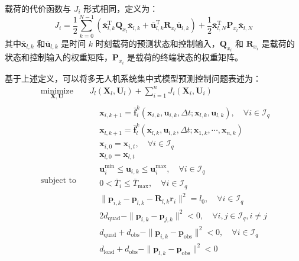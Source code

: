 \documentclass[lang=chs, degree=master, blindreview=false, winfonts=true]{yanputhesis}
\begin{document}
载荷的代价函数与 \( J_i \) 形式相同，定义为：
\begin{equation}
    J_i = \frac{1}{2}\sum_{k=0}^{N-1}\left(\bar{\boldsymbol{x}}_{l,k}^\mathrm{T}\boldsymbol{Q}_{x_l}\bar{\boldsymbol{x}}_{l,k}+\bar{\boldsymbol{u}}_{l,k}^\mathrm{T}\boldsymbol{R}_{x_l}\bar{\boldsymbol{u}}_{l,k}\right)+\frac{1}{2}\bar{\boldsymbol{x}}_{l,N}^\mathrm{T}\boldsymbol{P}_{x_l}\bar{\boldsymbol{x}}_{l,N}
	\label{jpayload}
\end{equation}
其中$\bar{\boldsymbol{x}}_{l,k}$ 和$\bar{\boldsymbol{u}}_{l,k}$ 是时间 $k$ 时刻载荷的预测状态和控制输入，$\boldsymbol{Q}_{x_i}$ 和 $\boldsymbol{R}_{x_i}$ 是载荷的状态和控制输入的权重矩阵，$\boldsymbol{P}_{x_i}$ 是载荷的终端状态的权重矩阵。


基于上述定义，可以将多无人机系统集中式模型预测控制问题表述为：
\begin{equation}
	\begin{aligned} 
	&\operatorname*{minimize}_{\bm{X}, \bm{U}}& & J_l(\bm{X}_l, \bm{U}_l) + \sum_{i=1}^n J_i(\bm{X}_i, \bm{U}_i)  \\
	&\text{subject to}& & \begin{aligned}
	& \bm{x}_{i,k+1} = \bar{\bm{f}}_i^k(\bm{x}_{i,k}, \bm{u}_{i,k}, \Delta t; \bm{x}_{l,k}, \bm{u}_{l,k}), \quad \forall i \in \mathcal{I}_q \\
	& \bm{x}_{l,k+1} = \bar{\bm{f}}_l^k(\bm{x}_{l,k}, \bm{u}_{l,k}, \Delta t; \bm{x}_{1,k}, \cdots, \bm{x}_{n,k}) \\
	& \bm{x}_{i,0} = \bm{x}_{i,t}, \quad \forall i \in \mathcal{I}_q \\
	& \bm{x}_{l,0} = \bm{x}_{l,t} \\
	& \bm{u}_{i}^{\min} \leq \bm{u}_{i,k} \leq \bm{u}_{i}^{\max}, \quad \forall i \in \mathcal{I}_q \\
	& 0 < \bar{T}_i \leq \bar{T}_{\max}, \quad \forall i \in \mathcal{I}_q \\
	& \|\bm{p}_{i,k} - \bm{p}_{l,k} - \bm{R}_{l,k} \bm{r}_i\|^2 = l_0, \quad \forall i \in \mathcal{I}_q \\
	& 2d_\text{quad} - \|\bm{p}_{i,k} - \bm{p}_{j,k}\|^2 < 0, \quad \forall i, j \in \mathcal{I}_q, i \neq j \\
	& d_\text{quad} + d_\text{obs} - \|\bm{p}_{i,k} - \bm{p}_\text{obs}\|^2 < 0, \quad \forall i \in \mathcal{I}_q \\
	& d_\text{load} + d_\text{obs} - \|\bm{p}_{l,k} - \bm{p}_\text{obs}\|^2 < 0        
	\end{aligned}	
\end{aligned}
\label{multimpc}
\end{equation}
\end{document}
